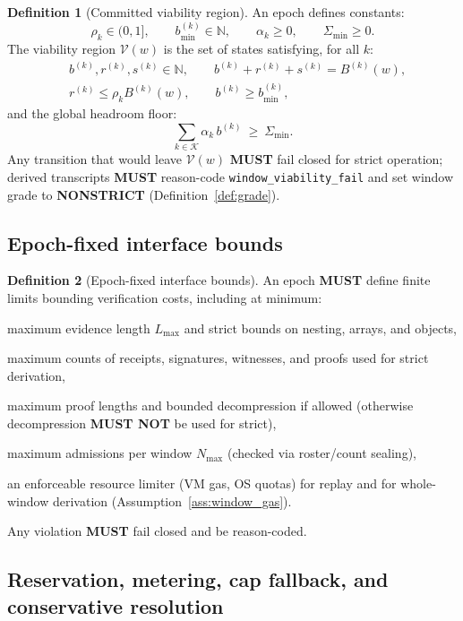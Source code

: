 \documentclass[11pt]{article}
\newcommand{\MUST}{\textbf{MUST}}
\newcommand{\MUSTNOT}{\textbf{MUST NOT}}
\newcommand{\code}[1]{\texttt{#1}}
\newcommand{\N}{\mathbb{N}}
\newcommand{\1}{\mathbf{1}}
\theoremstyle{definition}
\newtheorem{definition}{Definition}
\theoremstyle{plain}
\begin{document}
\begin{definition}[Committed viability region]
\label{def:V}
An epoch defines constants:
\[
\rho_k\in(0,1],\qquad b^{(k)}_{\min}\in\N,\qquad \alpha_k\ge 0,\qquad \Sigma_{\min}\ge 0.
\]
The viability region $\mathcal{V}(w)$ is the set of states satisfying, for all $k$:
\begin{align*}
&b^{(k)}, r^{(k)}, s^{(k)} \in \N,\qquad b^{(k)}+r^{(k)}+s^{(k)}=B^{(k)}(w),\\
&r^{(k)}\le \rho_k B^{(k)}(w),\qquad b^{(k)}\ge b^{(k)}_{\min},
\end{align*}
and the global headroom floor:
\[
\sum_{k\in\mathcal{K}}\alpha_k\,b^{(k)}\ \ge\ \Sigma_{\min}.
\]
Any transition that would leave $\mathcal{V}(w)$ \MUST{} fail closed for strict operation; derived transcripts \MUST{} reason-code \code{window\_viability\_fail} and set window grade to \textbf{NONSTRICT} (Definition~\ref{def:grade}).
\end{definition}

\subsection{Epoch-fixed interface bounds}
\begin{definition}[Epoch-fixed interface bounds]
\label{def:bounds}
An epoch \MUST{} define finite limits bounding verification costs, including at minimum:
\begin{tightitemize}
\item maximum evidence length $L_{\max}$ and strict bounds on nesting, arrays, and objects,
\item maximum counts of receipts, signatures, witnesses, and proofs used for strict derivation,
\item maximum proof lengths and bounded decompression if allowed (otherwise decompression \MUSTNOT{} be used for strict),
\item maximum admissions per window $N_{\max}$ (checked via roster/count sealing),
\item an enforceable resource limiter (VM gas, OS quotas) for replay and for whole-window derivation (Assumption~\ref{ass:window_gas}).
\end{tightitemize}
Any violation \MUST{} fail closed and be reason-coded.
\end{definition}

\subsection{Reservation, metering, cap fallback, and conservative resolution}
\label{sec:charging}
\end{document}
